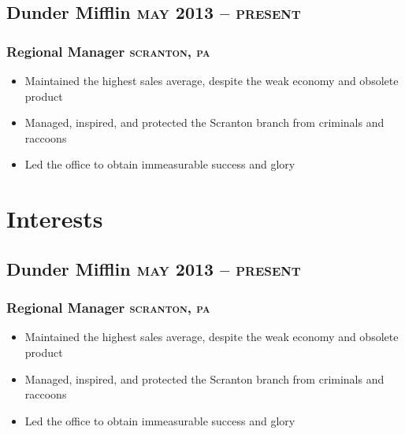 \documentclass{article}
\newcommand{\rside}[1]{\hfill \normalfont\scshape\MakeLowercase{#1}}
\begin{document}
\subsection{Dunder Mifflin \rside{May 2013 -- Present}}
\subsubsection{Regional Manager \rside{Scranton, PA}}
\begin{itemize}
  \item Maintained the highest sales average, despite the weak economy and obsolete product
  \item Managed, inspired, and protected the Scranton branch from criminals and raccoons
  \item Led the office to obtain immeasurable success and glory
\end{itemize}

\section{\faHeart \enspace Interests}
\subsection{Dunder Mifflin \rside{May 2013 -- Present}}
\subsubsection{Regional Manager \rside{Scranton, PA}}
\begin{itemize}
  \item Maintained the highest sales average, despite the weak economy and obsolete product
  \item Managed, inspired, and protected the Scranton branch from criminals and raccoons
  \item Led the office to obtain immeasurable success and glory
\end{itemize}
\end{document}
